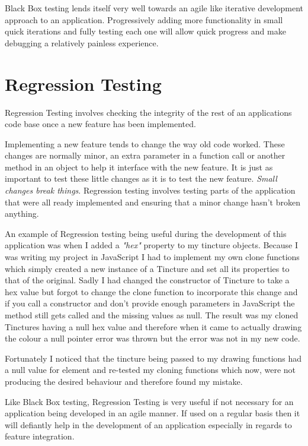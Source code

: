 Black Box testing lends itself very well towards an agile like  iterative development approach to an application.  Progressively adding more functionality in small quick iterations and fully testing each one will allow quick progress and make debugging a relatively painless experience.  


\section{Regression Testing}
Regression Testing involves checking the integrity of the rest of an applications code base once a new feature has been implemented.  

Implementing a new feature tends to change the way old code worked. These changes are normally minor, an extra parameter in a function call or another method in an object to help it interface with the new feature.  It is just as important to test these little changes as it is to test the new feature.  \emph{Small changes break things}.  Regression testing involves testing parts of the application that were all ready implemented and ensuring that a minor change hasn't broken anything. 


An example of Regression testing being useful during the development of this application was when I added a \emph{"hex"} property to my tincture objects.  Because I was writing my project in JavaScript I had to implement my own clone functions which simply created a new instance of a Tincture and set all its properties to that of the original.  Sadly I had changed the constructor of Tincture to take a hex value but  forgot to change the clone function to incorporate this change and if you call a constructor and don't provide enough parameters in JavaScript the method still gets called and the missing values as null.  The result was my cloned Tinctures having a null hex value and therefore when it came to actually drawing the colour a null pointer error was thrown but the error was not in my new code. 

Fortunately I noticed that the tincture being passed to my drawing functions had a null value for element and re-tested my cloning functions which now, were not producing the desired behaviour and therefore found my mistake. 


Like Black Box testing, Regression Testing is very useful if not necessary for an application being developed in an agile manner.  If used on a regular basis then it will defiantly help in the development of an application especially in regards to feature integration.  


